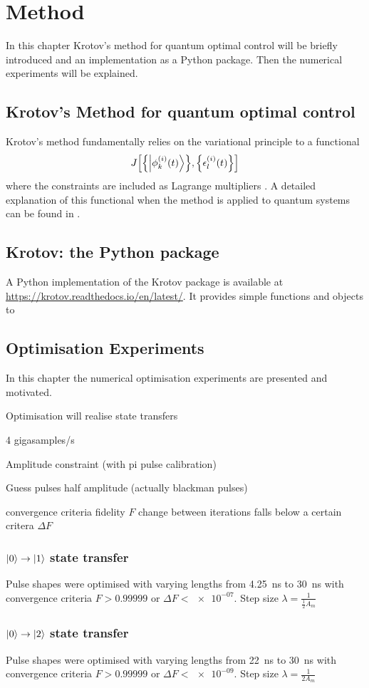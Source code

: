 \documentclass[main.tex]{subfiles}
\begin{document}
\chapter{Method}
In this chapter Krotov's method for quantum optimal control will be briefly introduced and an implementation as a Python package.
Then the numerical experiments will be explained.

\section{Krotov's Method for quantum optimal control}
Krotov's method fundamentally relies on the variational principle to \minimize{} a functional \[ J\qty[\qty{\ket{\phi^{(i)}_k(t)}},\qty{\epsilon_l^{(i)}(t)}] \] where the constraints are included as Lagrange multipliers \cite{goerz_krotov:_2019}.
A detailed explanation of this functional when the method is applied to quantum systems can be found in \autocite{reich_monotonically_2012}. 

\section{Krotov: the Python package}
A Python implementation of the Krotov package is available at \url{https://krotov.readthedocs.io/en/latest/}. It provides simple functions and objects to


\section{Optimisation Experiments}
In this chapter the numerical optimisation experiments are presented and motivated.

Optimisation will realise state transfers

4 gigasamples/s

Amplitude constraint (with pi pulse calibration)

Guess pulses half amplitude (actually blackman pulses)

convergence criteria
fidelity \(F\)
change between iterations falls below a certain critera \(\Delta F\)

\subsection{\texorpdfstring{\boldmath\(\ket{0}\rightarrow\ket{1}\)}{0 -> 1} state transfer}
Pulse shapes were optimised with varying lengths from \SI{4.25}{\nano\second} to \SI{30}{\nano\second} with convergence criteria \(F>0.99999\) or \(\Delta F < \num{e-07}\). Step size \(\lambda = \frac{1}{\frac{1}{2}A_{m}}\)

\subsection{\texorpdfstring{\boldmath\(\ket{0}\rightarrow\ket{2}\)}{0 -> 2} state transfer}
Pulse shapes were optimised with varying lengths from \SI{22}{\nano\second} to \SI{30}{\nano\second} with convergence criteria \(F>0.99999\) or \(\Delta F < \num{e-09}\). Step size \(\lambda = \frac{1}{2A_{m}}\)
\end{document}

